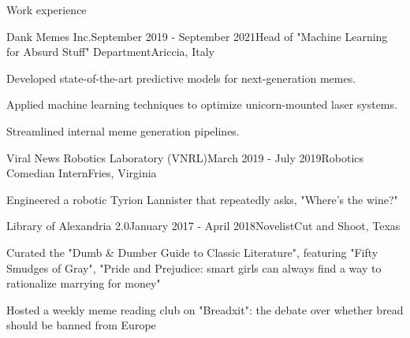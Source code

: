 \documentclass{resume} %
\begin{document}
\begin{rSection}{Work experience}

    \begin{rSubsection}{Dank Memes Inc.}{September 2019 - September 2021}{Head of "Machine Learning for Absurd Stuff" Department}{Ariccia, Italy}
        \item Developed state-of-the-art predictive models for next-generation memes.
        \item Applied machine learning techniques to optimize unicorn-mounted laser systems.
        \item Streamlined internal meme generation pipelines.
    \end{rSubsection}
    
    \begin{rSubsection}{Viral News Robotics Laboratory (VNRL)}{March 2019 - July 2019}{Robotics Comedian Intern}{Fries, Virginia}
        \item Engineered a robotic Tyrion Lannister that repeatedly asks, "Where's the wine?"
    \end{rSubsection}
    
    \begin{rSubsection}{Library of Alexandria 2.0}{January 2017 - April 2018}{Novelist}{Cut and Shoot, Texas}
        \item Curated the "Dumb \& Dumber Guide to Classic Literature", featuring "Fifty Smudges 
        of Gray", "Pride and Prejudice: smart girls can always find a way to rationalize marrying for money"
        \item Hosted a weekly meme reading club on "Breadxit": the debate over whether bread should be banned from Europe
    \end{rSubsection}
    
\end{rSection}

\end{document}
